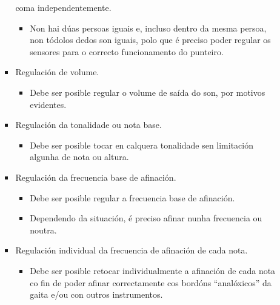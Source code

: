 \begin{itemize}
\begin{itemize}
\begin{itemize}
                       coma independentemente.
                       \begin{itemize}
                        \item Non hai dúas persoas iguais e, incluso dentro da
                              mesma persoa, non tódolos dedos son iguais, polo
                              que é preciso poder regular os sensores para o
                              correcto funcionamento do punteiro.
                       \end{itemize}
                 \item Regulación de volume.
                       \begin{itemize}
                        \item Debe ser posible regular o volume de saída do
                              son, por motivos evidentes.
                       \end{itemize}
                 \item Regulación da tonalidade ou nota base.
                       \begin{itemize}
                        \item Debe ser posible tocar en calquera tonalidade sen
                              limitación algunha de nota ou altura.
                       \end{itemize}
                 \item Regulación da frecuencia base de afinación.
                       \begin{itemize}
                        \item Debe ser posible regular a frecuencia base de
                              afinación.
                        \item Dependendo da situación, é preciso afinar nunha
                              frecuencia ou noutra.
                       \end{itemize}
                 \item Regulación individual da frecuencia de afinación de cada
                       nota.
                       \begin{itemize}
                        \item Debe ser posible retocar individualmente a
                              afinación de cada nota co fin de poder afinar
                              correctamente cos bordóns “analóxicos” da gaita
                              e/ou con outros instrumentos.
                       \end{itemize}

\end{itemize}
\end{itemize}
\end{itemize}

